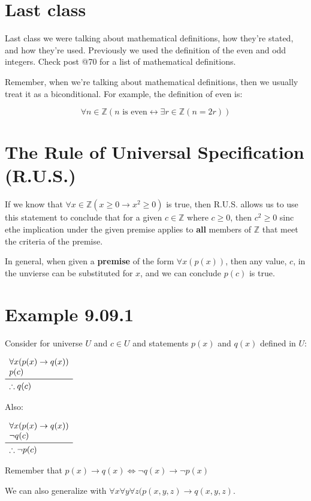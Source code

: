 \documentclass{article}
\newcommand{\logicrule}[2]{
\begin{array}{l}
#1 \\
\midrule
\therefore #2 \\
\end{array}
}
\begin{document}
\section*{Last class}

Last class we were talking about mathematical definitions, how they're
stated, and how they're used. Previously we used the definition of the
even and odd integers. Check post @70 for a list of mathematical
definitions.

Remember, when we're talking about mathematical definitions, then we
usually treat it as a biconditional. For example, the definition of
even is:

\[
\forall n\in\mathbb{Z}\left(\text{$n$ is even}\leftrightarrow\exists r\in\mathbb{Z}\left(n=2r\right)\right)
\]

\section*{The Rule of Universal Specification (R.U.S.)}

If we know that
$\forall{}x\in\mathbb{Z}(x\ge{}0\rightarrow{}x^2{}\ge{}0)$ is true,
then R.U.S. allows us to use this statement to conclude that for a
given $c\in\mathbb{Z}$ where $c\ge{}0$, then $c^2\ge{}0$ sinc ethe
implication under the given premise applies to \textbf{all} members of
$\mathbb{Z}$ that meet the criteria of the premise.

In general, when given a \textbf{premise} of the form
$\forall{}x(p(x))$, then any value, $c$, in the unvierse can be
substituted for $x$, and we can conclude $p(c)$ is true.

\section*{Example 9.09.1}

Consider for universe $U$ and $c\in{}U$ and statements $p(x)$ and $q(x)$ defined in $U$:

$\logicrule{\forall{}x(p(x)\rightarrow{}q(x)) \\ p(c)}{q(c)}$

Also:

$\logicrule{\forall{}x(p(x)\rightarrow{}q(x)) \\ \neg{}q(c)}{\neg{}p(c)}$

Remember that $p(x)\rightarrow{}q(x)\Leftrightarrow\neg{}q(x)\rightarrow\neg{}p(x)$

We can also generalize with
$\forall{}x\forall{}y\forall{}z(p(x,y,z)\rightarrow{}q(x,y,z)$.
\end{document}
